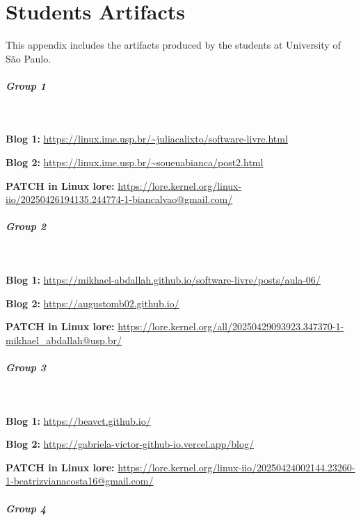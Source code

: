 \chapter{Students Artifacts}

\label{app:stuart}

This appendix includes the artifacts produced by the students at University of São Paulo.

\paragraph{Group 1}

\

\textbf{Blog 1:} \url{https://linux.ime.usp.br/~juliacalixto/software-livre.html}

\textbf{Blog 2:} \url{https://linux.ime.usp.br/~soueuabianca/post2.html}

\textbf{PATCH in Linux lore:} \url{https://lore.kernel.org/linux-iio/20250426194135.244774-1-biancalvao@gmail.com/}

\paragraph{Group 2}

\

\textbf{Blog 1:} \url{https://mikhael-abdallah.github.io/software-livre/posts/aula-06/}

\textbf{Blog 2:} \url{https://augustomb02.github.io/}

\textbf{PATCH in Linux lore:} \url{https://lore.kernel.org/all/20250429093923.347370-1-mikhael_abdallah@usp.br/}

\paragraph{Group 3}

\

\textbf{Blog 1:} \url{https://beavct.github.io/}

\textbf{Blog 2:} \url{https://gabriela-victor-github-io.vercel.app/blog/}

\textbf{PATCH in Linux lore:} \url{https://lore.kernel.org/linux-iio/20250424002144.23260-1-beatrizvianacosta16@gmail.com/}

\paragraph{Group 4}

\

